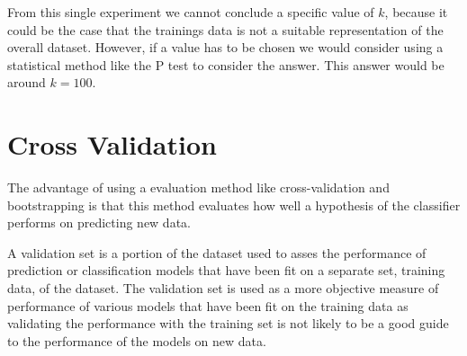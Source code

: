 \documentclass[a4paper]{article}
\begin{document}
From this single experiment we cannot conclude a specific value of $k$, because it could be the case that the trainings data is not a suitable representation of the overall dataset. However, if a value has to be chosen we would consider using a statistical method like the P test to consider the answer. This answer would be around $k = 100$.

\section{Cross Validation}
The advantage of using a evaluation method like cross-validation and bootstrapping is that this method evaluates how well a hypothesis of the classifier performs on predicting new data.

A validation set is a portion of the dataset used to asses the performance of prediction or classification models that have been fit on a separate set, training data, of the dataset. The validation set is used as a more objective measure of performance of various models that have been fit on the training data as validating the performance with the training set is not likely to be a good guide to the performance of the models on new data.
\end{document}
